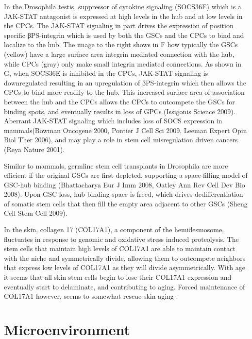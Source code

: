 \documentclass[]{book}
\begin{document}
In the Drosophila testis, suppressor of cytokine signaling (SOCS36E) which is a JAK-STAT antagonist is expressed at high levels in the hub and at low levels in the CPCs. The JAK-STAT signaling in part drives the expression of position specific βPS-integrin which is used by both the GSCs and the CPCs to bind and localize to the hub. The image to the right shows in F how typically the GSCs (yellow) have a large surface area integrin mediated connection with the hub, while CPCs (gray) only make small integrin mediated connections. As shown in G, when SOCS36E is inhibited in the CPCs, JAK-STAT signaling is downregulated resulting in an upregulation of βPS-integrin which then allows the CPCs to bind more readily to the hub. This increased surface area of association between the hub and the CPCs allows the CPCs to outcompete the GSCs for binding spots, and eventually results in loss of GPCs (Issigonis Science 2009). Aberrant JAK-STAT signaling which includes loss of SOCS expression in mammals(Bowman Oncogene 2000, Pontier J Cell Sci 2009, Leeman Expert Opin Biol Ther 2006), and may play a role in stem cell misregulation driven cancers (Reya Nature 2001).

Similar to mammals, germline stem cell transplants in Drosophila are more efficient if the original GSCs are first depleted, supporting a space-filling model of GSC-hub binding (Bhattacharya Eur J Imm 2008, Oatley Ann Rev Cell Dev Bio 2008). Upon GSC loss, hub binding space is freed, which drives dedifferentiation of somatic stem cells that then fill the empty area adjacent to other GSCs (Sheng Cell Stem Cell 2009).

In the skin, collagen 17 (COL17A1), a component of the hemidesmosome, fluctuates in response to genomic and oxidative stress induced proteolysis. The stem cells that maintain high levels of COL17A1 are able to maintain contact with the niche and symmetrically divide, allowing them to outcompete neighbors that express low levels of COL17A1 as they will divide asymmetrically. With age it seems that all skin stem cells begin to lose their COL17A1 expression and eventually start to delaminate, and contributing to aging. Forced maintenance of COL17A1 however, seems to somewhat rescue skin aging \citep{liu2019stem}.

\hypertarget{microenvironment}{%
\section{Microenvironment}\label{microenvironment}}
\end{document}
